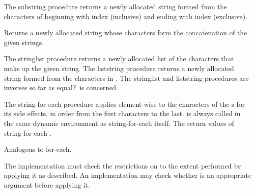 \begin{entry}{%
}

The {\cf substring} procedure returns a newly allocated string formed from the characters of
 beginning with index  (inclusive) and ending with index
 (exclusive).
\end{entry}


\begin{entry}{%
}

Returns a newly allocated string whose characters form the concatenation of the
given strings.
\end{entry}


\begin{entry}{%
}

The {\cf string\coerce{}list} procedure returns a newly allocated list of the
characters that make up the given string.  The {\cf
  list\coerce{}string} procedure
returns a newly allocated string formed from the characters in 
. The {\cf string\coerce{}list}
and {\cf list\coerce{}string} procedures are
inverses so far as {\cf equal?}\ is concerned.  
\end{entry}

\begin{entry}{%
}

The {\cf string-for-each} procedure applies 
element-wise to the characters of the
s for its side effects,  in order from the first characters to the
last.
 is always called in the same dynamic environment 
as {\cf string-for-each} itself.
The return values of {\cf string-for-each} \areunspecified.

Analogous to {\cf for-each}.

\implresp The implementation must check the restrictions
on  to the extent performed by applying it as described.
An
implementation may check whether  is an appropriate argument
before applying it.
\end{entry}


